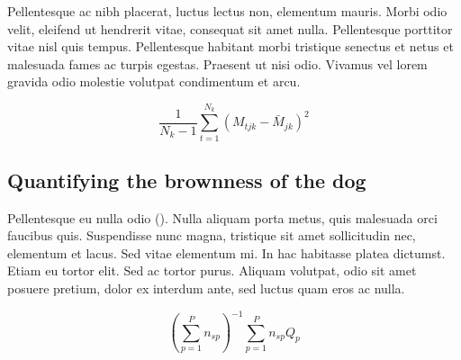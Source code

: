 \documentclass[11pt]{article}
\begin{document}
Pellentesque ac nibh placerat, luctus lectus non, elementum mauris. 
Morbi odio velit, eleifend ut hendrerit vitae, consequat sit amet 
nulla. Pellentesque porttitor vitae nisl quis tempus. Pellentesque 
habitant morbi tristique senectus et netus et malesuada fames ac 
turpis egestas. Praesent ut nisi odio. Vivamus vel lorem gravida 
odio molestie volutpat condimentum et arcu. 

\begin{equation}
{ \frac{1}{N_k-1} \sum \limits_{t=1}^{N_k} (M_{tjk} - \bar{M}_{jk})^2}
\end{equation}

\subsection*{Quantifying the brownness of the dog}

Pellentesque eu nulla odio (\citealt{Xiao2015,CookEtAl2015}). Nulla 
aliquam porta metus, quis malesuada orci faucibus quis. Suspendisse nunc 
magna, tristique sit amet sollicitudin nec, elementum et lacus. Sed 
vitae elementum mi. In hac habitasse platea dictumst. Etiam eu tortor 
elit. Sed ac tortor purus. Aliquam volutpat, odio sit amet posuere 
pretium, dolor ex interdum ante, sed luctus quam eros ac nulla. 

\begin{equation}
{ (\sum \limits_{p=1}^P {n_{sp}})^{-1}\sum \limits_{p=1}^P {n_{sp}Q_{p}}}
\end{equation}

\newpage{}






\end{document}
